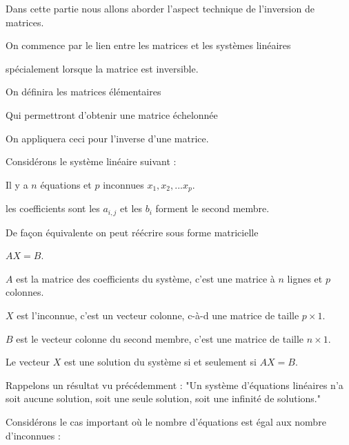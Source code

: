 







\debuttexte


\diapo
    
\change
Dans cette partie nous allons aborder l'aspect technique de l'inversion de matrices.

\change
On commence par le lien entre les matrices et les systèmes linéaires

\change
spécialement lorsque la matrice est inversible.

\change
On définira les matrices élémentaires

\change
Qui permettront d'obtenir une matrice échelonnée

\change
On appliquera ceci pour l'inverse d'une matrice.


\diapo

Considérons le système linéaire suivant :

Il y a $n$ équations et $p$ inconnues $x_1,x_2,...x_p$.

les coefficients sont les $a_{i,j}$ et les $b_i$ forment le second membre.


\change
De façon équivalente on peut réécrire  sous forme matricielle

$AX=B$.

$A$ est la matrice des coefficients du système, c'est une matrice à $n$ lignes et $p$ colonnes.

$X$ est l'inconnue, c'est un vecteur colonne, c-à-d une matrice de taille $p \times 1$.

$B$ est le vecteur colonne du second membre, c'est une matrice de taille $n \times 1$.


Le vecteur $X$ est une solution du système si et seulement si $AX = B.$

\change
Rappelons un résultat vu précédemment :
"Un système d'équations linéaires n'a soit aucune solution, 
soit une seule solution, soit une infinité de solutions."



\diapo

Considérons le cas important où le nombre d'équations est égal aux nombre d'inconnues :


